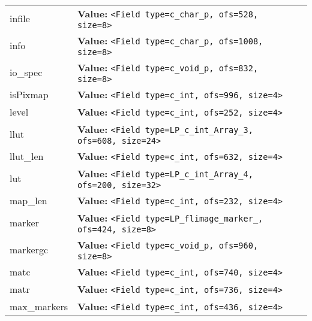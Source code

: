 \begin{longtable}{|p{\varnamewidth}|p{\vardescrwidth}|l}
\cline{1-2}
\raggedright i\-n\-f\-i\-l\-e\- & \raggedright \textbf{Value:} 
{\tt {\textless}Field type=c\_char\_p, ofs=528, size=8{\textgreater}}&\\
\cline{1-2}
\raggedright i\-n\-f\-o\- & \raggedright \textbf{Value:} 
{\tt {\textless}Field type=c\_char\_p, ofs=1008, size=8{\textgreater}}&\\
\cline{1-2}
\raggedright i\-o\-\_\-s\-p\-e\-c\- & \raggedright \textbf{Value:} 
{\tt {\textless}Field type=c\_void\_p, ofs=832, size=8{\textgreater}}&\\
\cline{1-2}
\raggedright i\-s\-P\-i\-x\-m\-a\-p\- & \raggedright \textbf{Value:} 
{\tt {\textless}Field type=c\_int, ofs=996, size=4{\textgreater}}&\\
\cline{1-2}
\raggedright l\-e\-v\-e\-l\- & \raggedright \textbf{Value:} 
{\tt {\textless}Field type=c\_int, ofs=252, size=4{\textgreater}}&\\
\cline{1-2}
\raggedright l\-l\-u\-t\- & \raggedright \textbf{Value:} 
{\tt {\textless}Field type=LP\_c\_int\_Array\_3, ofs=608, size=24{\textgreater}}&\\
\cline{1-2}
\raggedright l\-l\-u\-t\-\_\-l\-e\-n\- & \raggedright \textbf{Value:} 
{\tt {\textless}Field type=c\_int, ofs=632, size=4{\textgreater}}&\\
\cline{1-2}
\raggedright l\-u\-t\- & \raggedright \textbf{Value:} 
{\tt {\textless}Field type=LP\_c\_int\_Array\_4, ofs=200, size=32{\textgreater}}&\\
\cline{1-2}
\raggedright m\-a\-p\-\_\-l\-e\-n\- & \raggedright \textbf{Value:} 
{\tt {\textless}Field type=c\_int, ofs=232, size=4{\textgreater}}&\\
\cline{1-2}
\raggedright m\-a\-r\-k\-e\-r\- & \raggedright \textbf{Value:} 
{\tt {\textless}Field type=LP\_flimage\_marker\_, ofs=424, size=8{\textgreater}}&\\
\cline{1-2}
\raggedright m\-a\-r\-k\-e\-r\-g\-c\- & \raggedright \textbf{Value:} 
{\tt {\textless}Field type=c\_void\_p, ofs=960, size=8{\textgreater}}&\\
\cline{1-2}
\raggedright m\-a\-t\-c\- & \raggedright \textbf{Value:} 
{\tt {\textless}Field type=c\_int, ofs=740, size=4{\textgreater}}&\\
\cline{1-2}
\raggedright m\-a\-t\-r\- & \raggedright \textbf{Value:} 
{\tt {\textless}Field type=c\_int, ofs=736, size=4{\textgreater}}&\\
\cline{1-2}
\raggedright m\-a\-x\-\_\-m\-a\-r\-k\-e\-r\-s\- & \raggedright \textbf{Value:} 
{\tt {\textless}Field type=c\_int, ofs=436, size=4{\textgreater}}&\\

\end{longtable}
